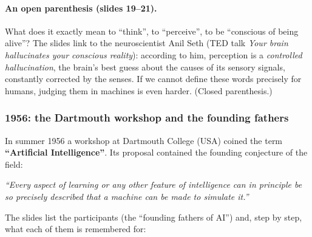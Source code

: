 \paragraph{An open parenthesis (slides 19--21).} What does it exactly mean to ``think'', to
``perceive'', to be ``conscious of being alive''? The slides link to the neuroscientist
Anil Seth (TED talk \emph{Your brain hallucinates your conscious reality}): according to him,
perception is a \emph{controlled hallucination}, the brain's best guess about the causes of
its sensory signals, constantly corrected by the senses. If we cannot define these words
precisely for humans, judging them in machines is even harder. (Closed parenthesis.)

\subsubsection{1956: the Dartmouth workshop and the founding fathers}

In summer 1956 a workshop at Dartmouth College (USA) coined the term
\textbf{``Artificial Intelligence''}. Its proposal contained the founding conjecture of the
field:

\begin{center}
\begin{minipage}{0.88\linewidth}
\itshape ``Every aspect of learning or any other feature of intelligence can in principle be
so precisely described that a machine can be made to simulate it.''
\end{minipage}
\end{center}

The slides list the participants (the ``founding fathers of AI'') and, step by step, what
each of them is remembered for:


